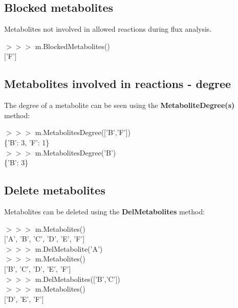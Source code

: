 

\subsection{Blocked metabolites}
Metabolites not involved in allowed reactions during flux analysis.

\begin{framed}
$>>>$ m.BlockedMetabolites()\\
$[$'F'$]$
\end{framed}


\subsection{Metabolites involved in reactions - degree}

The degree of a metabolite can be seen using the \textbf{MetaboliteDegree(s)} method:
\begin{framed}
$>>>$ m.MetabolitesDegree(['B','F'])\\
\{'B': 3, 'F': 1\}\\

$>>>$ m.MetabolitesDegree('B')\\
\{'B': 3\}
\end{framed}


\subsection{Delete metabolites}

Metabolites can be deleted using the \textbf{DelMetabolites} method:

\begin{framed}
$>>>$ m.Metabolites()\\
$[$'A', 'B', 'C', 'D', 'E', 'F'$]$\\

$>>>$ m.DelMetabolite('A')\\
$>>>$ m.Metabolites()\\
$[$'B', 'C', 'D', 'E', 'F'$]$\\

$>>>$ m.DelMetabolites(['B','C'])\\
$>>>$ m.Metabolites()\\
$[$'D', 'E', 'F'$]$
\end{framed}

